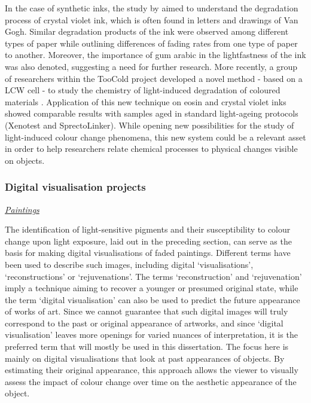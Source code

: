 In the case of synthetic inks, the study by \citet{confortin_study_2010} aimed to understand the degradation process of crystal violet ink, which is often found in letters and drawings of Van Gogh. Similar degradation products of the ink were observed among different types of paper while outlining differences of fading rates from one type of paper to another. Moreover, the importance of gum arabic in the lightfastness of the ink was also denoted, suggesting a need for further research. More recently, a group of researchers within the TooCold project developed a novel method - based on a \gls{LCW} cell - to study the chemistry of light-induced degradation of coloured materials \citep{den_uijl_comparing_2022}. Application of this new technique on eosin and crystal violet inks showed comparable results with samples aged in standard light-ageing protocols (Xenotest and SprectoLinker). While opening new possibilities for the study of light-induced colour change phenomena, this new system could be a relevant asset in order to help researchers relate chemical processes to physical changes visible on objects.\\


    
\subsubsection{Digital visualisation projects}

\textit{\underline{Paintings}}

The identification of light-sensitive pigments and their susceptibility to colour change upon light exposure, laid out in the preceding section, can serve as the basis for making digital visualisations of faded paintings. Different terms have been used to describe such images, including digital ‘visualisations’, ‘reconstructions’ or ‘rejuvenations’. The terms ‘reconstruction’ and ‘rejuvenation’ imply a technique aiming to recover a younger or presumed original state, while the term ‘digital visualisation’ can also be used to predict the future appearance of works of art. Since we cannot guarantee that such digital images will truly correspond to the past or original appearance of artworks, and since ‘digital visualisation’ leaves more openings for varied nuances of interpretation, it is the preferred term that will mostly be used in this dissertation. The focus here is mainly on digital visualisations that look at past appearances of objects. By estimating their original appearance, this approach allows the viewer to visually assess the impact of colour change over time on the aesthetic appearance of the object. \\

